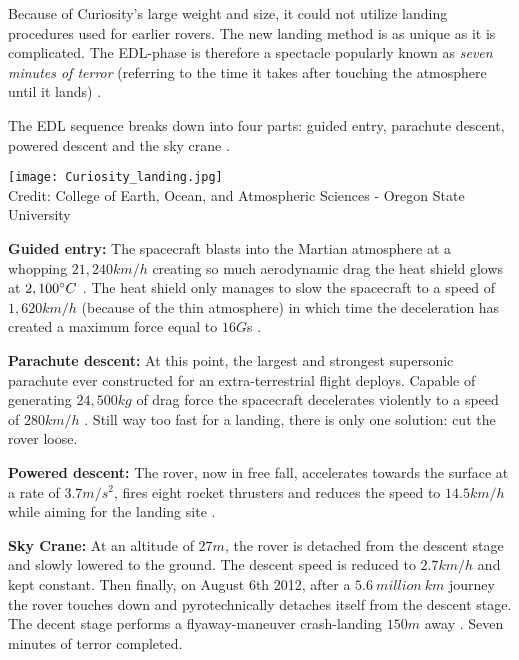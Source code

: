 \begin{tcolorbox}[colback=red!5,colframe=DarkRed!40!black,title=Entry\, Descent and Landing (EDL)]
Because of Curiosity’s large weight and size, it could not utilize landing procedures used for earlier rovers.
The new landing method is as unique as it is complicated.
The EDL-phase is therefore a spectacle popularly known as \textit{seven minutes of terror} (referring to the time it takes after touching the atmosphere until it lands) \cite{CNN_7minterror}. 

The EDL sequence breaks down into four parts: guided entry, parachute descent, powered descent and the sky crane \cite{NASALanding}. \vspace{1mm}

\begin{center}
	\texttt{[image: Curiosity\_landing.jpg]}
	\\
	\tiny{Credit: College of Earth, Ocean, and Atmospheric Sciences - Oregon State University}
\end{center}

\textbf{Guided entry:}
The spacecraft blasts into the Martian atmosphere at a whopping $21,240 km/h$ creating so much aerodynamic drag the heat shield glows at $2,100 \degree C$ \cite{NASA_youtube}.
The heat shield only manages to slow the spacecraft to a speed of $1,620 km/h$ (because of the thin atmosphere) in which time the deceleration has created a maximum force equal to $16 G$s \cite{HistoricLanding} \cite{NASALanding}.

\textbf{Parachute descent:}
At this point, the largest and strongest supersonic parachute ever constructed for an extra-terrestrial flight deploys.
Capable of generating $24,500 kg$ of drag force the spacecraft decelerates violently to a speed of $280 km/h$ \cite{Parachute} \cite{NASALanding}.
Still way too fast for a landing, there is only one solution: cut the rover loose.

\textbf{Powered descent:}
The rover, now in free fall, accelerates towards the surface at a rate of $3.7 m/s^{2}$, fires eight rocket thrusters and reduces the speed to $14.5 km/h$ while aiming for the landing site \cite{HistoricLanding} \cite{NASALanding}. 

\textbf{Sky Crane:}
At an altitude of $27 m$, the rover is detached from the descent stage and slowly lowered to the ground.
The descent speed is reduced to $2.7 km/h$ and kept constant.
Then finally, on August 6th 2012, after a $5.6\ million\ km$ \cite{CNNCuriosity} journey the rover touches down and pyrotechnically detaches itself from the descent stage.
The decent stage performs a flyaway-maneuver crash-landing $150 m$ away \cite{HistoricLanding} \cite{NASALanding}. Seven minutes of terror completed.
\end{tcolorbox}